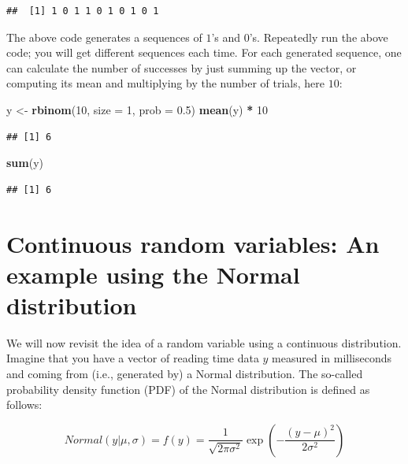 \documentclass[12pt,]{krantz}
\newenvironment{Shaded}{\begin{snugshade}}{\end{snugshade}}
\newcommand{\DataTypeTok}[1]{\textcolor[rgb]{0.13,0.29,0.53}{#1}}
\newcommand{\DecValTok}[1]{\textcolor[rgb]{0.00,0.00,0.81}{#1}}
\newcommand{\FloatTok}[1]{\textcolor[rgb]{0.00,0.00,0.81}{#1}}
\newcommand{\KeywordTok}[1]{\textcolor[rgb]{0.13,0.29,0.53}{\textbf{#1}}}
\newcommand{\NormalTok}[1]{#1}
\newcommand{\OperatorTok}[1]{\textcolor[rgb]{0.81,0.36,0.00}{\textbf{#1}}}
\newcommand{\StringTok}[1]{\textcolor[rgb]{0.31,0.60,0.02}{#1}}
\begin{document}
\begin{verbatim}
##  [1] 1 0 1 1 0 1 0 1 0 1
\end{verbatim}

The above code generates a sequences of \(1\)'s and \(0\)'s. Repeatedly run the above code; you will get different sequences each time. For each generated sequence, one can calculate the number of successes by just summing up the vector, or computing its mean and multiplying by the number of trials, here \(10\):

\begin{Shaded}
\begin{Highlighting}[]
\NormalTok{y <-}\StringTok{ }\KeywordTok{rbinom}\NormalTok{(}\DecValTok{10}\NormalTok{, }\DataTypeTok{size =} \DecValTok{1}\NormalTok{, }\DataTypeTok{prob =} \FloatTok{0.5}\NormalTok{)}
\KeywordTok{mean}\NormalTok{(y) }\OperatorTok{*}\StringTok{ }\DecValTok{10}
\end{Highlighting}
\end{Shaded}

\begin{verbatim}
## [1] 6
\end{verbatim}

\begin{Shaded}
\begin{Highlighting}[]
\KeywordTok{sum}\NormalTok{(y)}
\end{Highlighting}
\end{Shaded}

\begin{verbatim}
## [1] 6
\end{verbatim}

\hypertarget{continuous-random-variables-an-example-using-the-normal-distribution}{%
\section{Continuous random variables: An example using the Normal distribution}\label{continuous-random-variables-an-example-using-the-normal-distribution}}

We will now revisit the idea of a random variable using a continuous distribution. Imagine that you have a vector of reading time data \(y\) measured in milliseconds and coming from (i.e., generated by) a Normal distribution. The so-called probability density function (PDF) of the Normal distribution is defined as follows:

\begin{equation}
Normal(y|\mu,\sigma)=f(y)= \frac{1}{\sqrt{2\pi \sigma^2}} \exp \left(-\frac{(y-\mu)^2}{2\sigma^2} \right)
\end{equation}
\end{document}
